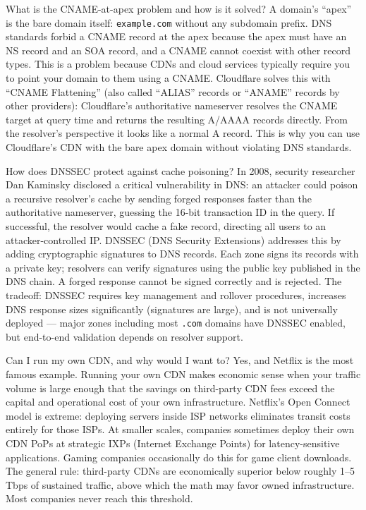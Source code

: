 \documentclass[11pt,a4paper]{article}
\begin{document}
\begin{curiobox}{What is the CNAME-at-apex problem and how is it solved?}
A domain's ``apex'' is the bare domain itself: \texttt{example.com} without any subdomain prefix. DNS standards forbid a CNAME record at the apex because the apex must have an NS record and an SOA record, and a CNAME cannot coexist with other record types. This is a problem because CDNs and cloud services typically require you to point your domain to them using a CNAME. Cloudflare solves this with ``CNAME Flattening'' (also called ``ALIAS'' records or ``ANAME'' records by other providers): Cloudflare's authoritative nameserver resolves the CNAME target at query time and returns the resulting A/AAAA records directly. From the resolver's perspective it looks like a normal A record. This is why you can use Cloudflare's CDN with the bare apex domain without violating DNS standards.
\end{curiobox}

\begin{curiobox}{How does DNSSEC protect against cache poisoning?}
In 2008, security researcher Dan Kaminsky disclosed a critical vulnerability in DNS: an attacker could poison a recursive resolver's cache by sending forged responses faster than the authoritative nameserver, guessing the 16-bit transaction ID in the query. If successful, the resolver would cache a fake record, directing all users to an attacker-controlled IP. DNSSEC (DNS Security Extensions) addresses this by adding cryptographic signatures to DNS records. Each zone signs its records with a private key; resolvers can verify signatures using the public key published in the DNS chain. A forged response cannot be signed correctly and is rejected. The tradeoff: DNSSEC requires key management and rollover procedures, increases DNS response sizes significantly (signatures are large), and is not universally deployed --- major zones including most \texttt{.com} domains have DNSSEC enabled, but end-to-end validation depends on resolver support.
\end{curiobox}

\begin{curiobox}{Can I run my own CDN, and why would I want to?}
Yes, and Netflix is the most famous example. Running your own CDN makes economic sense when your traffic volume is large enough that the savings on third-party CDN fees exceed the capital and operational cost of your own infrastructure. Netflix's Open Connect model is extreme: deploying servers inside ISP networks eliminates transit costs entirely for those ISPs. At smaller scales, companies sometimes deploy their own CDN PoPs at strategic IXPs (Internet Exchange Points) for latency-sensitive applications. Gaming companies occasionally do this for game client downloads. The general rule: third-party CDNs are economically superior below roughly 1--5 Tbps of sustained traffic, above which the math may favor owned infrastructure. Most companies never reach this threshold.
\end{curiobox}
\end{document}
